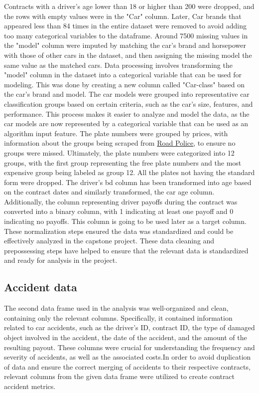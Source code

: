 \documentclass{IEEEtran}
\begin{document}
Contracts with a driver's age lower than 18 or higher than 200 were dropped, and the rows with empty values were in the "Car" column. Later, Car brands that appeared less than 84 times in the entire dataset were removed to avoid adding too many categorical variables to the dataframe.  Around 7500 missing values in the "model" column were imputed by matching the car's brand and horsepower with those of other cars in the dataset, and then assigning the missing model the same value as the matched cars. Data processing involves transforming the "model" column in the dataset into a categorical variable that can be used for modeling. This was done by creating a new column called "Car-class" based on the car's brand and model. The car models were grouped into representative car classification groups based on certain criteria, such as the car's size, features, and performance. This process makes it easier to analyze and model the data, as the car models are now represented by a categorical variable that can be used as an algorithm input feature. The plate numbers were grouped by prices, with information about the groups being scraped from 
\href{https://roadpolice.am}{Road Police}, to ensure no groups were missed.  Ultimately, the plate numbers were categorized into 12 groups, with the first group representing the free plate numbers and the most expensive group being labeled as group 12. All the plates not having the standard form were dropped. The driver's bd column has been transformed into age based on the contract dates and similarly transformed, the car age column. Additionally, the column representing driver payoffs during the contract was converted into a binary column, with 1 indicating at least one payoff and 0 indicating no payoffs. This column is going to be used later as a target column. These normalization steps ensured the data was standardized and could be effectively analyzed in the capstone project. These data cleaning and prepossessing steps have helped to ensure that the relevant data is standardized and ready for analysis in the project. 

\subsection{Accident data}

The second data frame used in the analysis was well-organized and clean, containing only the relevant columns. Specifically, it contained information related to car accidents, such as the driver's ID, contract ID, the type of damaged object involved in the accident, the date of the accident, and the amount of the resulting payout. These columns were crucial for understanding the frequency and severity of accidents, as well as the associated costs.In order to avoid duplication of data and ensure the correct merging of accidents to their respective contracts, relevant columns from the given data frame were utilized to create contract accident metrics.
\end{document}
